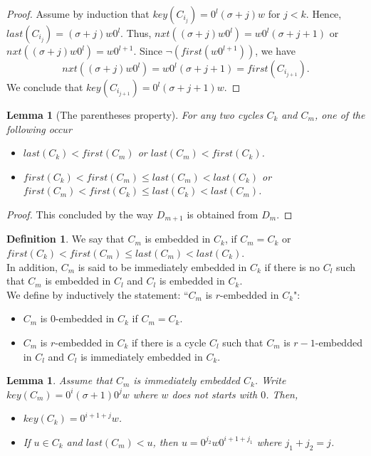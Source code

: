 \documentclass{article}
\newtheorem{lemma}[theorem]{Lemma}
\theoremstyle{definition}
\newtheorem{definition}[theorem]{Definition}
\begin{document}
\begin{proof}
	Assume by induction that $key(C_{i_j})=0^l(\sigma+j)w$ for $j<k$. Hence, $last(C_{i_j})=(\sigma+j)w0^l$. Thus, $nxt((\sigma+j)w0^l)=w0^l(\sigma+j+1)$ or $nxt((\sigma+j)w0^l)=w0^{l+1}$. Since $\neg(first(w0^{l+1}))$, we have 
	$$nxt((\sigma+j)w0^l)=w0^l(\sigma+j+1)=first(C_{i_{j+1}}).$$
	We conclude that $key(C_{i_{j+1}})=0^l(\sigma+j+1)w$.
\end{proof}

\begin{lemma}[The parentheses property]
	\label{parenthesis}
	For any two cycles $C_k$ and $C_m$, one of the following occur
	\begin{itemize}
		\item $last(C_k)<first(C_m)$ or $last(C_m)<first(C_k)$.
		
		\item $first(C_k)<first(C_m)\leq last(C_m)<last(C_k)$ or \\
		$first(C_m)<first(C_k)\leq last(C_k)<last(C_m)$.
	\end{itemize}
\end{lemma}
\begin{proof}
	This concluded by the way $D_{m+1}$ is obtained from $D_m$.
\end{proof}

\begin{definition}
	We say that $C_m$ is embedded in $C_k$, if $C_m=C_k$ or $first(C_k)<first(C_m)\leq last(C_m)<last(C_k)$.\\ 
	In addition, $C_m$ is said to be immediately embedded in $C_k$ if there is no $C_l$ such that $C_m$ is embedded in $C_l$ and $C_l$ is embedded in $C_k$.\\ 
	We define by inductively the statement: ``$C_m$ is $r$-embedded in $C_k$":
	\begin{itemize}
		\item $C_m$ is $0$-embedded in $C_k$ if $C_m=C_k$.
		\item $C_m$ is $r$-embedded in $C_k$ if there is a cycle $C_l$ such that $C_m$ is $r-1$-embedded in $C_l$ and $C_l$ is immediately embedded in $C_k$. 
	\end{itemize} 
\end{definition}

\begin{lemma}
	\label{embedding-properties}
	Assume that $C_m$ is immediately embedded $C_k$. Write $key(C_m)=0^i(\sigma+1)0^jw$ where $w$ does not starts with $0$. Then,
	\begin{itemize}
		\item $key(C_k) =0^{i+1+j}w$.
		\item If $u\in C_k$ and $last(C_m)<u$, then $u=0^{j_2}w0^{i+1+j_1}$ where $j_1+j_2=j$. 
	\end{itemize}
\end{lemma}
\end{document}
